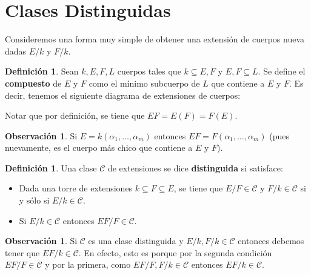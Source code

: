 \documentclass[12pt]{book}
\theoremstyle{definition}
\newtheorem{obs}[teo]{Observación}
\newtheorem{defn}[teo]{Definición}
\begin{document}
\section{Clases Distinguidas}
Consideremos una forma muy simple de obtener una extensión de cuerpos nueva dadas $E/k$ y $F/k$.

\begin{defn}
Sean $k,E,F,L$ cuerpos tales que $k\subseteq E,F$ y $E,F\subseteq L$. Se define el \textbf{compuesto} de $E$ y $F$ como el mínimo subcuerpo de $L$ que contiene a $E$ y $F$. Es decir, tenemos el siguiente diagrama de extensiones de cuerpos:
\begin{center}
\end{center}
Notar que por definición, se tiene que $EF= E(F)=F(E)$.
\end{defn}

\begin{obs}
Si $E=k(\alpha_1,\ldots , \alpha_m)$ entonces $EF= F(\alpha_1,\ldots , \alpha_m)$ (pues nuevamente, es el cuerpo más chico que contiene a $E$ y $F$).
\end{obs}

\begin{defn}
Una clase $\mathscr{C}$ de extensiones se dice \textbf{distinguida} si satisface:
\begin{itemize}
\item Dada una torre de extensiones $k\subseteq F\subseteq E$, se tiene que $E/F\in\mathscr{C}$ y $F/k\in\mathscr{C}$ si y sólo si $E/k\in \mathscr{C}$.
\item Si $E/k\in\mathscr{C}$ entonces $EF/F\in\mathscr{C}$.
\end{itemize}
\end{defn}

\begin{obs}
Si $\mathscr{C}$ es una clase distinguida y $E/k, F/k\in\mathscr{C}$ entonces debemos tener que $EF/k\in\mathscr{C}$. En efecto, esto es porque por la segunda condición $EF/F\in\mathscr{C}$ y por la primera, como $EF/F, F/k\in\mathscr{C}$ entonces $EF/k\in\mathscr{C}$.
\end{obs}
\end{document}
